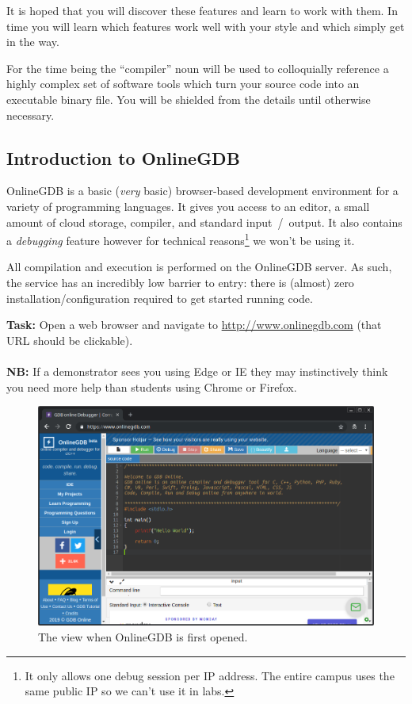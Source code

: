 \documentclass{lab}
\begin{document}
It is hoped that you will discover these features and learn to work with them. In time you will learn which features work well with your style and which simply get in the way.

For the time being the ``compiler'' noun will be used to colloquially reference a highly complex set of software tools which turn your source code into an executable binary file. You will be shielded from the details until otherwise necessary.

\subsection{Introduction to OnlineGDB}

OnlineGDB is a basic (\textit{very} basic) browser-based development environment for a variety of programming languages. It gives you access to an editor, a small amount of cloud storage, compiler, and standard input~/~output. It also contains a \textit{debugging} feature however for technical reasons\footnote{It only allows one debug session per IP address. The entire campus uses the same public IP so we can't use it in labs.} we won't be using it.

All compilation and execution is performed on the OnlineGDB server. As such, the service has an incredibly low barrier to entry: there is (almost) zero installation/configuration required to get started running code.

\textbf{Task:} Open a web browser and navigate to \url{http://www.onlinegdb.com} (that URL should be clickable).\\ \\ \textbf{NB:} If a demonstrator sees you using Edge or IE they may instinctively think you need more help than students using Chrome or Firefox.

\begin{figure}[H]
\begin{center}
\includegraphics[width=\textwidth]{onlinegdb.png}
\end{center}
\caption{The view when OnlineGDB is first opened.}\label{fig:onlinegdb}
\end{figure}
\end{document}
